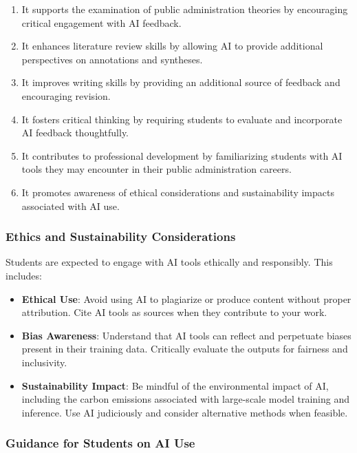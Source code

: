 \documentclass[11pt, letterpaper]{article}
\begin{document}
\begin{enumerate}
    \item It supports the examination of public administration theories by encouraging critical engagement with AI feedback.
    \item It enhances literature review skills by allowing AI to provide additional perspectives on annotations and syntheses.
    \item It improves writing skills by providing an additional source of feedback and encouraging revision.
    \item It fosters critical thinking by requiring students to evaluate and incorporate AI feedback thoughtfully.
    \item It contributes to professional development by familiarizing students with AI tools they may encounter in their public administration careers.
    \item It promotes awareness of ethical considerations and sustainability impacts associated with AI use.
\end{enumerate}

\subsubsection*{Ethics and Sustainability Considerations}

\noindent Students are expected to engage with AI tools ethically and responsibly. This includes:

\begin{itemize}
    \item \textbf{Ethical Use}: Avoid using AI to plagiarize or produce content without proper attribution. Cite AI tools as sources when they contribute to your work.
    \item \textbf{Bias Awareness}: Understand that AI tools can reflect and perpetuate biases present in their training data. Critically evaluate the outputs for fairness and inclusivity.
    \item \textbf{Sustainability Impact}: Be mindful of the environmental impact of AI, including the carbon emissions associated with large-scale model training and inference. Use AI judiciously and consider alternative methods when feasible.
\end{itemize}

\subsubsection*{Guidance for Students on AI Use}
\end{document}
